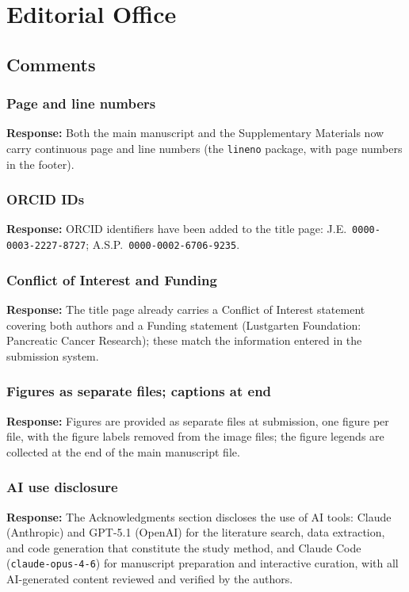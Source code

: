 \documentclass[11pt]{article}
\newcommand{\response}[1]{\textcolor{responsecolor}{\textbf{Response:} #1}}
\begin{document}
\bigskip

\section*{Editorial Office}

\subsection*{Comments}

\subsubsection*{Page and line numbers}
\response{Both the main manuscript and the Supplementary Materials now carry continuous page and line numbers (the \texttt{lineno} package, with page numbers in the footer).}

\subsubsection*{ORCID IDs}
\response{ORCID identifiers have been added to the title page: J.E.\ \texttt{0000-0003-2227-8727}; A.S.P.\ \texttt{0000-0002-6706-9235}.}

\subsubsection*{Conflict of Interest and Funding}
\response{The title page already carries a Conflict of Interest statement covering both authors and a Funding statement (Lustgarten Foundation: Pancreatic Cancer Research); these match the information entered in the submission system.}

\subsubsection*{Figures as separate files; captions at end}
\response{Figures are provided as separate files at submission, one figure per file, with the figure labels removed from the image files; the figure legends are collected at the end of the main manuscript file.}

\subsubsection*{AI use disclosure}
\response{The Acknowledgments section discloses the use of AI tools: Claude (Anthropic) and GPT-5.1 (OpenAI) for the literature search, data extraction, and code generation that constitute the study method, and Claude Code (\texttt{claude-opus-4-6}) for manuscript preparation and interactive curation, with all AI-generated content reviewed and verified by the authors.}
\end{document}
